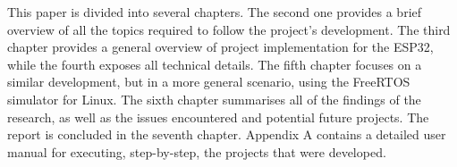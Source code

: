 This paper is divided into several chapters. The second one provides a brief overview of all the topics required to follow the project's development.
The third chapter provides a general overview of project implementation for the ESP32, while the fourth exposes all technical details. The fifth chapter focuses on a similar development, but in a more general scenario, using the FreeRTOS simulator for Linux.
The sixth chapter summarises all of the findings of the research, as well as the issues encountered and potential future projects. The report is concluded in the seventh chapter.
Appendix A contains a detailed user manual for executing, step-by-step, the projects that were developed.